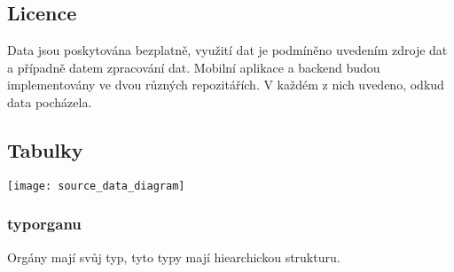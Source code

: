 \subsection{Licence}

Data jsou poskytována bezplatně, využití dat je podmíněno uvedením zdroje dat a případně datem zpracování dat. Mobilní aplikace a backend budou implementovány ve dvou různých repozitářích. V každém z nich uvedeno, odkud data pocházela.

\subsection{Tabulky}

\texttt{[image: source\_data\_diagram]}

\subsubsection{typ\textunderscore organu}

Orgány mají svůj typ, tyto typy mají hiearchickou strukturu.


